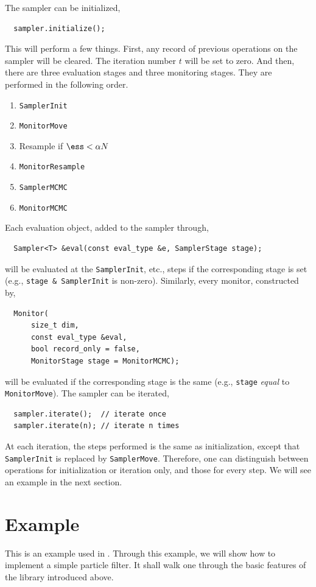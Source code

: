 The sampler can be initialized,
\begin{Verbatim}
  sampler.initialize();
\end{Verbatim}
This will perform a few things. First, any record of previous operations on the
sampler will be cleared. The iteration number $t$ will be set to zero. And
then, there are three evaluation stages and three monitoring stages. They are
performed in the following order.
\begin{enumerate}
  \item \verb|SamplerInit|
  \item \verb|MonitorMove|
  \item Resample if $\ess < \alpha N$
  \item \verb|MonitorResample|
  \item \verb|SamplerMCMC|
  \item \verb|MonitorMCMC|
\end{enumerate}
Each evaluation object, added to the sampler through,
\begin{Verbatim}
  Sampler<T> &eval(const eval_type &e, SamplerStage stage);
\end{Verbatim}
will be evaluated at the \verb|SamplerInit|, etc., steps if the corresponding
stage is set (e.g., \verb|stage & SamplerInit| is non-zero). Similarly, every
monitor, constructed by,
\begin{Verbatim}
  Monitor(
      size_t dim,
      const eval_type &eval,
      bool record_only = false,
      MonitorStage stage = MonitorMCMC);
\end{Verbatim}
will be evaluated if the corresponding stage is the same (e.g., \verb|stage|
\emph{equal} to \verb|MonitorMove|). The sampler can be iterated,
\begin{Verbatim}
  sampler.iterate();  // iterate once
  sampler.iterate(n); // iterate n times
\end{Verbatim}
At each iteration, the steps performed is the same as initialization, except
that \verb|SamplerInit| is replaced by \verb|SamplerMove|. Therefore, one can
distinguish between operations for initialization or iteration only, and those
for every step. We will see an example in the next section.

\section{Example}
\label{sec:Example (PF)}

This is an example used in \textcite{Johansen:2009wd}. Through this example, we
will show how to implement a simple particle filter. It shall walk one through
the basic features of the library introduced above.

